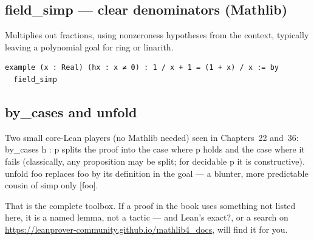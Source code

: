 \documentclass[12pt, openany]{book}
\theoremstyle{plain}
\theoremstyle{definition}
\theoremstyle{remark}
\newcommand{\li}[1]{{\ttfamily\small\color{tealaccent}#1}}
\begin{document}
\subsection*{\li{field\_simp} --- clear denominators \textbf{(Mathlib)}}

Multiplies out fractions, using nonzeroness hypotheses from the context, typically leaving a polynomial goal for \li{ring} or \li{linarith}.

\begin{leanbox}
\begin{lstlisting}
example (x : Real) (hx : x ≠ 0) : 1 / x + 1 = (1 + x) / x := by
  field_simp
\end{lstlisting}
\end{leanbox}
\color{black}

\subsection*{\li{by\_cases} and \li{unfold}}

Two small core-Lean players (no Mathlib needed) seen in Chapters~22 and~36: \li{by\_cases h : p} splits the proof into the case where \li{p} holds and the case where it fails (classically, any proposition may be split; for decidable \li{p} it is constructive).  \li{unfold foo} replaces \li{foo} by its definition in the goal --- a blunter, more predictable cousin of \li{simp only [foo]}.

\bigskip
\noindent That is the complete toolbox.  If a proof in the book uses something not listed here, it is a named lemma, not a tactic --- and Lean's \li{exact?}, or a search on \url{https://leanprover-community.github.io/mathlib4_docs}, will find it for you.

\backmatter
\end{document}
